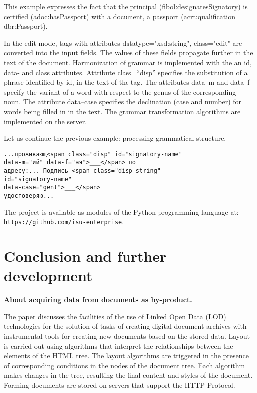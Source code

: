 \documentclass[conference,a4paper]{IEEEtran}
\providecommand\url[1]{\texttt{#1}}
\begin{document}
This example expresses the fact that the principal
(fibol:designates\-Signatory) is certified (adoc:hasPassport) with a
document, a passport (acrt:qualification dbr:Passport).

In the edit mode, tags with attributes
datatype="xsd:string", class="edit" are converted into the input
fields. The values of these fields propagate further in the text of the
document. Harmonization of grammar is implemented with the an id, data-
and class attributes. Attribute class=``disp'' specifies the
substitution of a phrase identified by id, in the text of the tag. The
attributes data--m and data--f specify the variant of a word with respect
to the genus of the corresponding noun. The attribute data--case
specifies the declination (case and number) for words being filled in in
the text. The grammar transformation algorithms are implemented on the
server.

Let us continue the previous example: processing grammatical structure.

\begin{verbatim}
...проживающ<span class="disp" id="signatory-name"
data-m="ий" data-f="ая">___</span> по
адресу:... Подпись <span class="disp string"
id="signatory-name"
data-case="gent">___</span>
удостоверяю...
\end{verbatim}

The project is available as modules of the Python programming language
at: \url{https://github.com/isu-enterprise}.

\section{Conclusion and further development}
\label{sec:conc}

\textbf{About acquiring data from documents as by-product.}

The paper discusses the facilities of the use of Linked Open Data (LOD)
technologies for the solution of tasks of {creating} digital document
archives with instrumental tools for creating new documents based on the
stored data. Layout is carried out using algorithms that interpret the
relationships between the elements of the HTML tree. The layout
algorithms are triggered in the presence of corresponding conditions in
the nodes of the document tree. Each algorithm makes changes in the
tree, resulting the final content and styles of the document. Forming
documents are stored on servers that support the HTTP Protocol.
\end{document}
